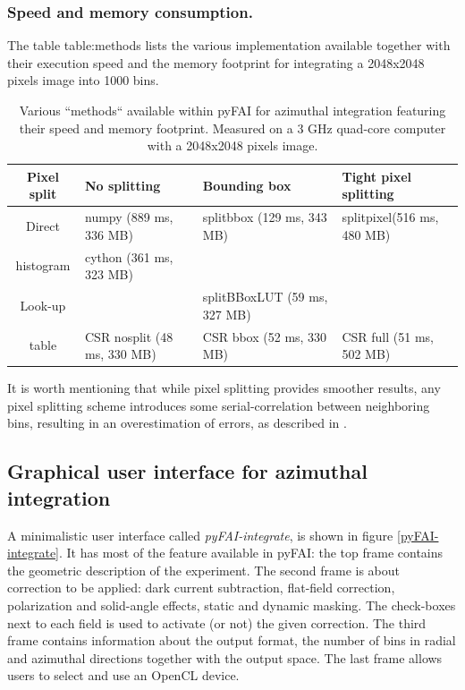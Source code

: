 \documentclass[preprint]{iucr}
\begin{document}
\subsubsection{Speed and memory consumption.}

The table {table:methods}  lists the various implementation available together
with their execution speed and the memory footprint for integrating a 2048x2048
pixels image into 1000 bins.

\begin{table}
\caption{Various ``methods`` available within pyFAI for azimuthal integration
featuring their speed and memory footprint. Measured on a 3 GHz quad-core
computer with a 2048x2048 pixels image.}
\begin{tabular}[pos]{|c|l|l|l|}
\hline
Pixel split& No splitting & Bounding box & Tight pixel splitting \\
\hline
Direct    & numpy (889 ms, 336 MB) & splitbbox (129 ms, 343 MB) &
splitpixel(516 ms, 480 MB)\\
histogram & cython (361 ms, 323 MB) &                       &                \\
\hline
Look-up   &       & splitBBoxLUT (59 ms, 327 MB) &    \\
table     & CSR nosplit (48 ms, 330 MB)       & CSR bbox (52 ms, 330
MB) & CSR full (51 ms, 502 MB)\\
\hline
\end{tabular}
\label{table:methods}
\end{table}

It is worth mentioning that while pixel splitting provides smoother results, any
pixel splitting scheme introduces some serial-correlation between
neighboring bins, resulting in an overestimation of errors, as described in \cite{billinge2014}.

\subsection{Graphical user interface for azimuthal integration}

A minimalistic user interface called \textit{pyFAI-integrate}, is
shown in figure \ref{pyFAI-integrate}.
It has most of the feature available in pyFAI:
the top frame contains the geometric description of the experiment.
The second frame is about correction to be applied: dark current subtraction,
flat-field correction, polarization and solid-angle effects, static and dynamic
masking. The check-boxes next to each field is used to activate (or not) the given
correction.
The third frame contains information about the output format, the number of bins
in radial and azimuthal directions together with the output space.
The last frame allows users to select and use an OpenCL device.
\end{document}
